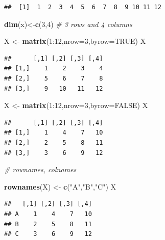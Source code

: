 \documentclass[]{article}
\newenvironment{Shaded}{\begin{snugshade}}{\end{snugshade}}
\newcommand{\KeywordTok}[1]{\textcolor[rgb]{0.13,0.29,0.53}{\textbf{{#1}}}}
\newcommand{\DataTypeTok}[1]{\textcolor[rgb]{0.13,0.29,0.53}{{#1}}}
\newcommand{\DecValTok}[1]{\textcolor[rgb]{0.00,0.00,0.81}{{#1}}}
\newcommand{\StringTok}[1]{\textcolor[rgb]{0.31,0.60,0.02}{{#1}}}
\newcommand{\CommentTok}[1]{\textcolor[rgb]{0.56,0.35,0.01}{\textit{{#1}}}}
\newcommand{\OtherTok}[1]{\textcolor[rgb]{0.56,0.35,0.01}{{#1}}}
\newcommand{\NormalTok}[1]{{#1}}
\numberwithin{equation}{section}
\begin{document}
\begin{verbatim}
##  [1]  1  2  3  4  5  6  7  8  9 10 11 12
\end{verbatim}

\begin{Shaded}
\begin{Highlighting}[]
\KeywordTok{dim}\NormalTok{(x)<-}\KeywordTok{c}\NormalTok{(}\DecValTok{3}\NormalTok{,}\DecValTok{4}\NormalTok{)  }\CommentTok{# 3 rows and 4 columns}

\NormalTok{X <-}\StringTok{ }\KeywordTok{matrix}\NormalTok{(}\DecValTok{1}\NormalTok{:}\DecValTok{12}\NormalTok{,}\DataTypeTok{nrow=}\DecValTok{3}\NormalTok{,}\DataTypeTok{byrow=}\OtherTok{TRUE}\NormalTok{)}
\NormalTok{X}
\end{Highlighting}
\end{Shaded}

\begin{verbatim}
##      [,1] [,2] [,3] [,4]
## [1,]    1    2    3    4
## [2,]    5    6    7    8
## [3,]    9   10   11   12
\end{verbatim}

\begin{Shaded}
\begin{Highlighting}[]
\NormalTok{X <-}\StringTok{ }\KeywordTok{matrix}\NormalTok{(}\DecValTok{1}\NormalTok{:}\DecValTok{12}\NormalTok{,}\DataTypeTok{nrow=}\DecValTok{3}\NormalTok{,}\DataTypeTok{byrow=}\OtherTok{FALSE}\NormalTok{)}
\NormalTok{X}
\end{Highlighting}
\end{Shaded}

\begin{verbatim}
##      [,1] [,2] [,3] [,4]
## [1,]    1    4    7   10
## [2,]    2    5    8   11
## [3,]    3    6    9   12
\end{verbatim}

\begin{Shaded}
\begin{Highlighting}[]
\CommentTok{# rownames, colnames}

\KeywordTok{rownames}\NormalTok{(X) <-}\StringTok{ }\KeywordTok{c}\NormalTok{(}\StringTok{"A"}\NormalTok{,}\StringTok{"B"}\NormalTok{,}\StringTok{"C"}\NormalTok{)}
\NormalTok{X}
\end{Highlighting}
\end{Shaded}

\begin{verbatim}
##   [,1] [,2] [,3] [,4]
## A    1    4    7   10
## B    2    5    8   11
## C    3    6    9   12
\end{verbatim}
\end{document}
